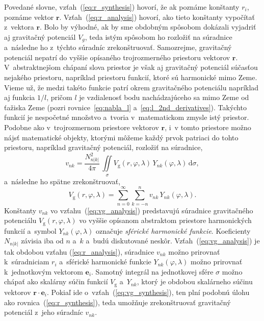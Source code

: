 \documentclass[a4paper,12pt]{book}
\newcommand{\diff}{\mathrm d}
\newcommand{\gidx}{\mathrm g}
\let\vec\mathbf
\begin{document}
Povedané slovne, vzťah~(\ref{eq:r_synthesis}) hovorí, že ak poznáme konštanty
$r_i$, poznáme vektor $\vec r$.  Vzťah~(\ref{eq:r_analysis}) hovorí, ako tieto
konštanty vypočítať z~vektora $\vec r$.  Bolo by výhodné, ak by sme obdobným
spôsobom dokázali vyjadriť aj gravitačný potenciál $V_g$, teda istým spôsobom
ho rozložiť na súradnice a~následne ho z~týchto súradníc zrekonštruovať.
Samozrejme, gravitačný potenciál nepatrí do vyššie opísaného trojrozmerného
priestoru vektorov $\vec r$.  V~abstraktnejšom chápaní slova priestor je však
aj gravitačný potenciál súčasťou nejakého priestoru, napríklad priestoru
funkcií, ktoré sú harmonické mimo Zeme.  Vieme už, že medzi takéto funkcie
patrí okrem gravitačného potenciálu napríklad aj funkcia $1 \slash l$, pričom
$l$ je vzdialenosť bodu nachádzajúceho sa mimo Zeme od ťažiska Zeme (pozri
rovnice~\ref{eq:nabla_l} a~\ref{eq:l_2nd_derivatives}).  Takýchto funkcií je
nespočetné množstvo a~tvoria v~matematickom zmysle istý priestor.  Podobne ako
v~trojrozmernom priestore vektorov $\vec r$, i~v tomto priestore možno nájsť
matematické objekty, ktorými môžeme každý prvok patriaci do tohto priestoru,
napríklad gravitačný potenciál, rozložiť na súradnice,
%
\begin{equation}
\label{eq:vg_analysis}
v_{nk} = \frac{N^2_{n|k|}}{4\pi} \, \iint\limits_{\sigma} V_\gidx(r, \varphi, 
\lambda) \, Y_{nk}(\varphi, \lambda) \, \diff \sigma{,}
\end{equation}
%
a~následne ho spätne zrekonštruovať,
%
\begin{equation}
\label{eq:vg_synthesis}
V_\gidx(r, \varphi, \lambda) = \sum_{n = 0}^{\infty} \sum_{k = -n}^{n} v_{nk}
\, Y_{nk}(\varphi, \lambda){.}
\end{equation}
%
Konštanty $v_{nk}$ vo vzťahu~(\ref{eq:vg_analysis}) predstavujú súradnice
gravitačného potenciálu $V_\gidx(r, \varphi, \lambda)$ vo vyššie opísanom
abstraktom priestore harmonických funkcií a~symbol $Y_{nk}(\varphi, \lambda)$
označuje \emph{sférické harmonické funkcie}.  Koeficienty $N_{n|k|}$ závisia
iba od $n$ a~$k$ a~budú diskutované neskôr.  Vzťah~(\ref{eq:vg_analysis}) je
tak obdobou vzťahu (\ref{eq:r_analysis}), súradnice $v_{nk}$ možno prirovnať
k~súradniciam $r_i$ a~sférické harmonické funkcie $Y_{nk}(\varphi, \lambda)$
možno prirovnať k~jednotkovým vektorom $\vec e_i$.  Samotný integrál na
jednotkovej sfére $\sigma$ možno chápať ako skalárny súčin funkcií $V_\gidx$
a~$Y_{nk}$, ktorý je obdobou skalárneho súčinu vektorov $\vec r \cdot \vec
e_i$.  Pokiaľ ide o~vzťah~(\ref{eq:vg_synthesis}), ten plní podobnú úlohu ako
rovnica~(\ref{eq:r_synthesis}), teda umožňuje zrekonštruovať gravitačný
potenciál z~jeho súradníc $v_{nk}$.
\end{document}
